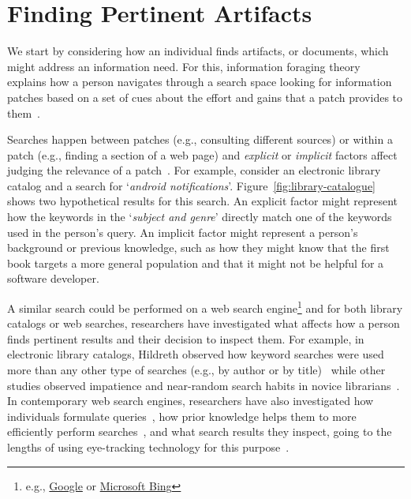 


\section{Finding Pertinent Artifacts}
\label{cp2:searching}


We start by considering how an individual finds 
artifacts, or documents, which might 
address an information need. 
For this, information foraging theory~\cite{Pirolli1999} explains how a person navigates through  
a search space looking for information patches  based on 
a set of cues about the effort and gains that a patch provides to them~\cite{Pirolli1999}.



Searches happen between patches (e.g., consulting different sources) or within a patch (e.g., finding a section of a web page) 
and \textit{explicit} or \textit{implicit} factors affect judging the relevance of a patch~\cite{saracevic1975}.
For example,
consider an electronic library catalog and a search for `\textit{android notifications}'.
Figure~\ref{fig:library-catalogue} shows two hypothetical results for this search. %
An explicit factor might represent how the keywords in the `\textit{subject and genre}' 
directly match one of the keywords used in the person's query. An implicit factor might represent 
a person's background or previous knowledge, such as how 
they might know that the first book targets a more general population and 
that it might not be helpful for a software developer.








A similar search could be performed on a web search engine\footnote{e.g., \href{https://www.google.com/}{Google} or \href{https://www.bing.com/}{Microsoft Bing}}
and for both library catalogs or web searches, researchers have investigated 
what affects how a person finds pertinent results and their decision to inspect them.
For example, in electronic library catalogs,
Hildreth observed how keyword searches were used more than any other type of searches (e.g., by author or by title)~\cite{hildreth1997}
while other  studies observed impatience and near-random search habits in novice librarians~\cite{novotny2004don}.
In contemporary web search engines, researchers have  also 
investigated how individuals formulate queries~\cite{gross2005have, bendersky2012},
how prior knowledge helps them
to more efficiently perform searches~\cite{DeGraaf2014},
and what search results they inspect, going to the lengths
of using eye-tracking technology for this purpose~\cite{Cutrell2007, marcos2015}.



